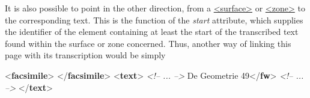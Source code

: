 It is also possible to point in the other direction, from a \hyperref[TEI.surface]{<surface>} or \hyperref[TEI.zone]{<zone>} to the corresponding text. This is the function of the {\itshape start} attribute, which supplies the identifier of the element containing at least the start of the transcribed text found within the surface or zone concerned. Thus, another way of linking this page with its transcription would be simply \par\bgroup{}\exampleFont \begin{shaded}\noindent\mbox{}{<\textbf{facsimile}>}\mbox{}\newline 
{}\mbox{}\newline 
\hspace*{1em}\mbox{}\newline 
{}\mbox{}\newline 
{</\textbf{facsimile}>}\mbox{}\newline 
{<\textbf{text}>}\mbox{}\newline 
{}\mbox{}\newline 
\hspace*{1em}\mbox{}\newline 
\textit{<!-- ... -->}\mbox{}\newline 
\hspace*{1em}\hspace*{1em}\mbox{}\newline 
\hspace*{1em}\hspace*{1em}De Geometrie 49{</\textbf{fw}>}\mbox{}\newline 
\textit{<!-- ... -->}\mbox{}\newline 
\hspace*{1em}\mbox{}\newline 
{}\mbox{}\newline 
{</\textbf{text}>}\end{shaded}\egroup\par 
